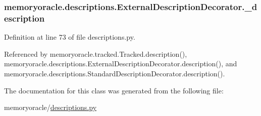 \subsubsection[{\+\_\+description}]{\setlength{\rightskip}{0pt plus 5cm}memoryoracle.\+descriptions.\+External\+Description\+Decorator.\+\_\+description\hspace{0.3cm}{\ttfamily [private]}}\label{classmemoryoracle_1_1descriptions_1_1ExternalDescriptionDecorator_ae42579816acbf90c9a28395fa0d55786}


Definition at line 73 of file descriptions.\+py.



Referenced by memoryoracle.\+tracked.\+Tracked.\+description(), memoryoracle.\+descriptions.\+External\+Description\+Decorator.\+description(), and memoryoracle.\+descriptions.\+Standard\+Description\+Decorator.\+description().



The documentation for this class was generated from the following file\+:\begin{DoxyCompactItemize}
\item 
memoryoracle/\hyperlink{descriptions_8py}{descriptions.\+py}\end{DoxyCompactItemize}
